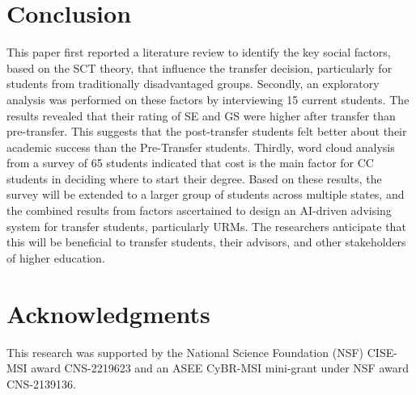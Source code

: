 \documentclass{article}
\begin{document}
\section{Conclusion}
This paper first reported a literature review to identify the key social factors, based on the SCT theory, that influence the transfer decision, particularly for students from traditionally disadvantaged groups. Secondly, an exploratory analysis was performed on these factors by interviewing 15 current students. %
The results revealed that their rating of SE and GS were higher after transfer than pre-transfer. 
This suggests that the post-transfer students felt better about their academic success than the Pre-Transfer students.
Thirdly, word cloud analysis from a survey of 65 students indicated that cost is the main factor for CC students in deciding where to start their degree. %
 Based on these results, the survey will be extended to a larger group of students across multiple states, and the combined results from factors ascertained to design an AI-driven advising system for transfer students, particularly URMs. %
 The researchers anticipate that this %
 will be beneficial to transfer students, their advisors, and other stakeholders of higher education.
\section{Acknowledgments}
\small
This research was supported by the National Science Foundation (NSF) CISE-MSI award CNS-2219623 and an ASEE CyBR-MSI mini-grant under NSF award CNS-2139136. 

\clearpage
\renewcommand*{\bibfont}{\fontsize{8}{8}\selectfont}
\printbibliography
\end{document}
